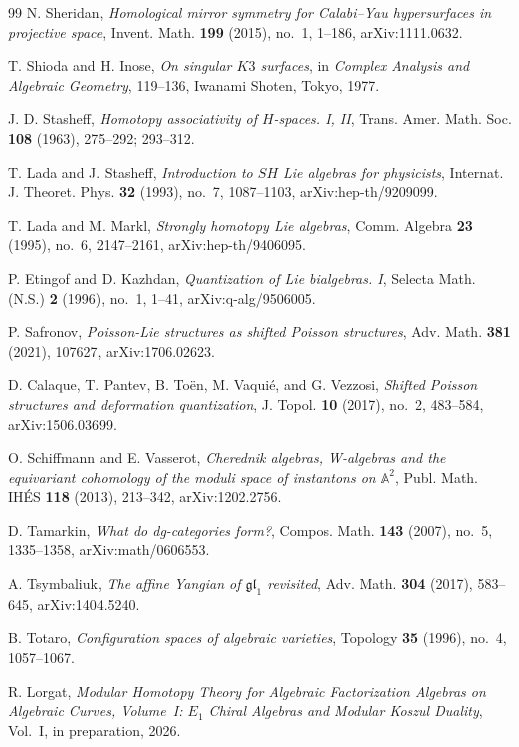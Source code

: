 \begin{thebibliography}{99}
N. Sheridan, \emph{Homological mirror symmetry for Calabi--Yau hypersurfaces in projective space}, Invent. Math. \textbf{199} (2015), no.~1, 1--186, arXiv:1111.0632.

T. Shioda and H. Inose, \emph{On singular $K3$ surfaces}, in \emph{Complex Analysis and Algebraic Geometry}, 119--136, Iwanami Shoten, Tokyo, 1977.

J. D. Stasheff, \emph{Homotopy associativity of $H$-spaces. I, II}, Trans. Amer. Math. Soc. \textbf{108} (1963), 275--292; 293--312.

T. Lada and J. Stasheff, \emph{Introduction to $SH$ Lie algebras for physicists}, Internat. J. Theoret. Phys. \textbf{32} (1993), no.~7, 1087--1103, arXiv:hep-th/9209099.

T. Lada and M. Markl, \emph{Strongly homotopy Lie algebras}, Comm. Algebra \textbf{23} (1995), no.~6, 2147--2161, arXiv:hep-th/9406095.

P. Etingof and D. Kazhdan, \emph{Quantization of Lie bialgebras. I}, Selecta Math. (N.S.) \textbf{2} (1996), no.~1, 1--41, arXiv:q-alg/9506005.

P. Safronov, \emph{Poisson-Lie structures as shifted Poisson structures}, Adv. Math. \textbf{381} (2021), 107627, arXiv:1706.02623.

D. Calaque, T. Pantev, B. To\"en, M. Vaqui\'e, and G. Vezzosi, \emph{Shifted Poisson structures and deformation quantization}, J. Topol. \textbf{10} (2017), no.~2, 483--584, arXiv:1506.03699.

O. Schiffmann and E. Vasserot, \emph{Cherednik algebras, W-algebras and the equivariant cohomology of the moduli space of instantons on $\mathbb{A}^2$}, Publ. Math. IH\'ES \textbf{118} (2013), 213--342, arXiv:1202.2756.

D. Tamarkin, \emph{What do dg-categories form?}, Compos. Math. \textbf{143} (2007), no.~5, 1335--1358, arXiv:math/0606553.

A. Tsymbaliuk, \emph{The affine Yangian of $\mathfrak{gl}_1$ revisited}, Adv. Math. \textbf{304} (2017), 583--645, arXiv:1404.5240.

B. Totaro, \emph{Configuration spaces of algebraic varieties}, Topology \textbf{35} (1996), no.~4, 1057--1067.

R. Lorgat, \emph{Modular Homotopy Theory for Algebraic Factorization Algebras on Algebraic Curves, Volume~I: $E_1$ Chiral Algebras and Modular Koszul Duality}, Vol.~I, in preparation, 2026.


\end{thebibliography}
